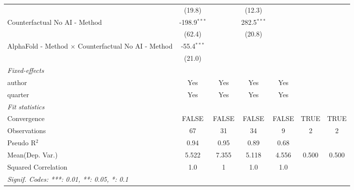 \begin{tabular}{lcccccc}
                                                              & (19.8)         &         & (12.3)         &              &      &   \\   
   Counterfactual No AI - Method                              & -198.9$^{***}$ &         & 282.5$^{***}$  &              &      &   \\   
                                                              & (62.4)         &         & (20.8)         &              &      &   \\   
   AlphaFold - Method $\times$ Counterfactual No AI - Method  & -55.4$^{***}$  &         &                &              &      &   \\   
                                                              & (21.0)         &         &                &              &      &   \\   
   \midrule
   \emph{Fixed-effects}\\
   author                                                     & Yes            & Yes     & Yes            & Yes          &      & \\  
   quarter                                                    & Yes            & Yes     & Yes            & Yes          &      & \\  
   \midrule
   \emph{Fit statistics}\\
   Convergence                                                &FALSE           & FALSE   & FALSE          & FALSE        & TRUE & TRUE\\  
   Observations                                               & 67             & 31      & 34             & 9            & 2    & 2\\  
   Pseudo R$^2$                                               & 0.94           & 0.95    & 0.89           & 0.68         &      & \\  
Mean(Dep. Var.) & 5.522 & 7.355 & 5.118 & 4.556 & 0.500 & 0.500 \\
   Squared Correlation                                        & 1.0            & 1       & 1.0            & 1.0          &      & \\  
   \midrule \midrule
   \multicolumn{7}{l}{\emph{Signif. Codes: ***: 0.01, **: 0.05, *: 0.1}}\\
\end{tabular}
\par\endgroup
